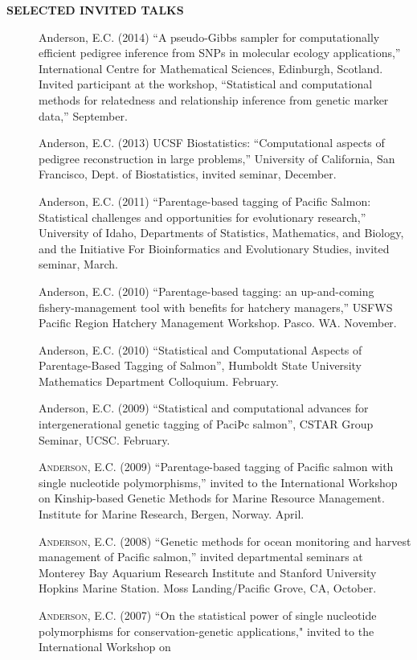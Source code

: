 \documentclass[11pt]{article}
\begin{document}
{\bf SELECTED INVITED TALKS}
\begin{description}
\item[] {\sc Anderson, E.C.} (2014) ``A pseudo-Gibbs sampler for computationally efficient pedigree inference from SNPs in molecular ecology applications,'' International Centre
for Mathematical Sciences, Edinburgh, Scotland. Invited participant at the workshop, ``Statistical and computational methods for relatedness and relationship inference from genetic marker data,'' September.
\item[] {\sc Anderson, E.C.} (2013) UCSF Biostatistics: ``Computational aspects of pedigree reconstruction in large problems,'' University of California, San Francisco, Dept. of 
Biostatistics, invited seminar, December.
\item[] {\sc Anderson, E.C.} (2011) ``Parentage-based  tagging of Pacific Salmon: Statistical challenges and opportunities for evolutionary research,'' University of Idaho, Departments of Statistics, Mathematics, and Biology, and the Initiative For Bioinformatics and Evolutionary Studies, invited seminar, March.
\item[] {\sc Anderson, E.C.} (2010) ``Parentage-based tagging: an up-and-coming fishery-management tool with benefits for hatchery managers,'' USFWS Pacific Region Hatchery Management Workshop. Pasco. WA. November.
\item[] {\sc Anderson, E.C.} (2010) ``Statistical and Computational Aspects of Parentage-Based Tagging of Salmon'', Humboldt State University Mathematics Department Colloquium. February.
\item[] {\sc Anderson, E.C.} (2009) ``Statistical and computational advances for intergenerational genetic tagging of PaciÞc salmon'', CSTAR Group Seminar, UCSC. February.
\item[] \textsc{Anderson, E.C.} (2009)  ``Parentage-based tagging of Pacific salmon with single nucleotide polymorphisms,'' invited to the International Workshop on Kinship-based Genetic Methods for Marine Resource Management. Institute for Marine Research, Bergen, Norway. April.
\item[] \textsc{Anderson, E.C.} (2008) ``Genetic methods for ocean monitoring and  harvest management of Pacific salmon,'' invited departmental seminars at Monterey Bay Aquarium Research Institute and Stanford University Hopkins Marine Station.  Moss Landing/Pacific Grove, CA, October.
\item[] \textsc{Anderson, E.C.} (2007) ``On the statistical power of  single nucleotide polymorphisms for conservation-genetic applications," invited to the International Workshop on

\end{description}
\end{document}
